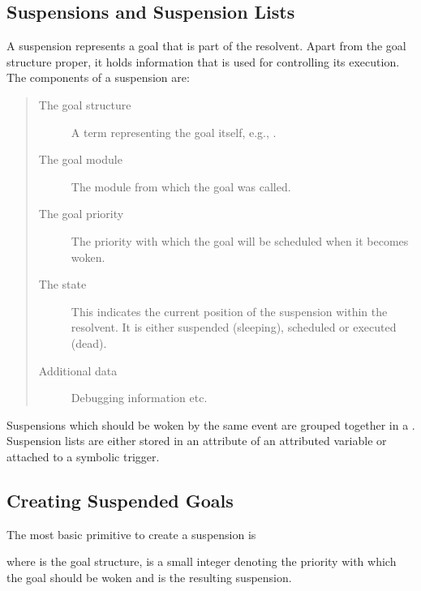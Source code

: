 
\subsection{Suspensions and Suspension Lists}
A suspension represents a goal that is part of the resolvent.
Apart from the goal structure proper, it holds information that
is used for controlling its execution.
The components of a suspension are:
\begin{quote}
\begin{description}
\item[The goal structure]
        A term representing the goal itself, e.g., .
\item[The goal module]
        The module from which the goal was called.
\item[The goal priority]
        The priority with which the goal will be scheduled when
        it becomes woken.
\item[The state]
        This indicates the current position of the suspension within
        the resolvent. It is either suspended (sleeping), scheduled
	or executed (dead).
\item[Additional data]
	Debugging information etc.
\end{description}
\end{quote}

Suspensions which should be woken by the same event are grouped
together in a .
Suspension lists are either stored in an attribute of
an attributed variable or attached to a symbolic trigger.


\subsection{Creating Suspended Goals}
The most basic primitive to create a suspension is
\begin{quote}
%
\end{quote}
where  is the goal structure,
 is a small integer denoting the priority with which
the goal should be woken and  is the resulting suspension.

